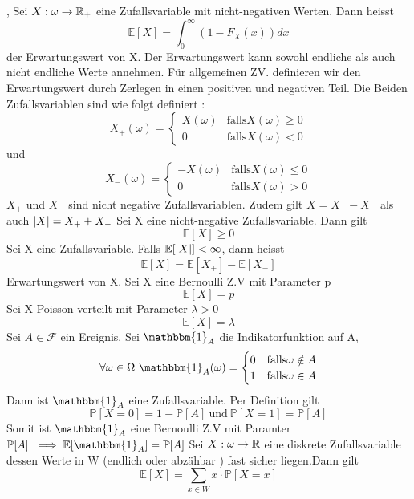 \sep
\Def[4.1] \newline
Sei \( X : \omega \rightarrow \mathbb{R}_+ \) eine Zufallsvariable mit nicht-negativen Werten. Dann heisst \[ \mathbb{E}[X] = \int_0^\infty (1-F_X(x)) dx\] der Erwartungswert von X. \newline
\Bem[4.2] \newline
Der Erwartungswert kann sowohl endliche als auch nicht endliche Werte annehmen. Für allgemeinen ZV. definieren wir den Erwartungswert durch Zerlegen in einen positiven und negativen Teil. Die Beiden Zufallsvariablen sind wie folgt definiert : \[X_+(\omega) = \begin{cases}
    X(\omega) & \text{falls} X(\omega) \geq 0 \\
    0 & \text{falls} X(\omega) < 0
\end{cases}\]
und \[X_-(\omega) = \begin{cases}
    -X(\omega) & \text{falls} X(\omega) \leq 0 \\
    0 & \text{falls} X(\omega) > 0
\end{cases}\]
\(X_+ \) und \(X_-\) sind nicht negative Zufallsvariablen. Zudem gilt \(X = X_+ - X_-\) als auch \( \left\lvert X \right\rvert = X_+ + X_-\)
\Satz[4.3] \newline
Sei X eine nicht-negative Zufallsvariable. Dann gilt \[ \mathbb{E}[X] \geq 0\]
\Def[4.4] Sei X eine Zufallsvariable. Falls \(\mathbb{E}[\left\lvert X \right\rvert] < \infty \), dann heisst \[ \mathbb{E}[X] = \mathbb{E}[X_+] - \mathbb{E}[X_-]\] Erwartungswert von X. \newline
\Bsp[4.5] \newline Sei X eine Bernoulli Z.V mit Parameter p \[\mathbb{E}[X] = p\] Sei X Poisson-verteilt mit Parameter \( \lambda > 0\) \[\mathbb{E}[X] = \lambda\] Sei \(A \in \mathcal{F}\) ein Ereignis. Sei \( \mathbbm{1}_A \) die Indikatorfunktion auf A, \[ \forall \omega \in \Omega \ \mathbbm{1}_A(\omega) = \begin{cases}
    0 & \text{falls} \omega \notin A \\
    1 & \text{falls} \omega \in A
\end{cases}\]
Dann ist \(\mathbbm{1}_A\) eine Zufallsvariable. Per Definition gilt \[\mathbb{P}[X = 0] = 1 - \mathbb{P}[A] \ \text{und} \ \mathbb{P}[X=1] = \mathbb{P}[A]\]
Somit ist \(\mathbbm{1}_A\) eine Bernoulli Z.V mit Paramter \( \mathbb{P}[A] \ \implies \mathbb{E}[\mathbbm{1}_A] = \mathbb{P}[A]\) \newline
\Satz[4.6] Sei \( X: \omega \rightarrow \mathbb{R} \) eine diskrete Zufallsvariable dessen Werte in W (endlich oder abzähbar ) fast sicher liegen.Dann gilt \[ \mathbb{E}[X] = \sum_{x \in W} x \cdot \mathbb{P}[X = x]\]
